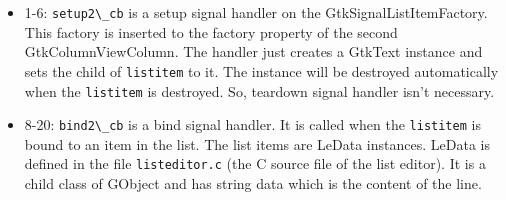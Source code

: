 \begin{itemize}
\tightlist
\item
  1-6: \passthrough{\lstinline!setup2\_cb!} is a setup signal handler on
  the GtkSignalListItemFactory. This factory is inserted to the factory
  property of the second GtkColumnViewColumn. The handler just creates a
  GtkText instance and sets the child of
  \passthrough{\lstinline!listitem!} to it. The instance will be
  destroyed automatically when the \passthrough{\lstinline!listitem!} is
  destroyed. So, teardown signal handler isn't necessary.
\item
  8-20: \passthrough{\lstinline!bind2\_cb!} is a bind signal handler. It
  is called when the \passthrough{\lstinline!listitem!} is bound to an
  item in the list. The list items are LeData instances. LeData is
  defined in the file \passthrough{\lstinline!listeditor.c!} (the C
  source file of the list editor). It is a child class of GObject and
  has string data which is the content of the line.


\end{itemize}
